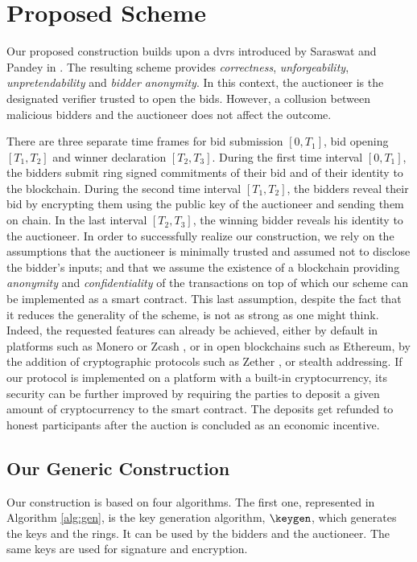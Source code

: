 \section{Proposed Scheme}
	Our proposed construction builds upon a \gls{dvrs} introduced by Saraswat and Pandey in \cite{saraswat2014leak}. The resulting scheme provides \textit{correctness}, \textit{unforgeability}, \textit{unpretendability} and \textit{bidder anonymity}. In this context, the auctioneer is the designated verifier trusted to open the bids. However, a collusion between malicious bidders and the auctioneer does not affect the outcome.

	There are three separate time frames for bid submission $[0,T_1]$, bid opening $[T_1,T_2]$ and winner declaration $[T_2,T_3]$. During the first time interval $[0,T_1]$, the bidders submit ring signed commitments of their bid and of their identity to the blockchain. During the second time interval $[T_1,T_2]$, the bidders reveal their bid by encrypting them using the public key of the auctioneer and sending them on chain. In the last interval $[T_2,T_3]$, the winning bidder reveals his identity to the auctioneer. In order to successfully realize our construction, we rely on the assumptions that the auctioneer is minimally trusted and assumed not to disclose the bidder's inputs; and that we assume the existence of a blockchain providing \textit{anonymity} and \textit{confidentiality} of the transactions on top of which our scheme can be implemented as a smart contract. This last assumption, despite the fact that it reduces the generality of the scheme, is not as strong as one might think. Indeed, the requested features can already be achieved, either by default in platforms such as Monero or Zcash \cite{sasson2014zerocash}, or in open blockchains such as Ethereum, by the addition of cryptographic protocols such as Zether \cite{bunz2019zether}, or stealth addressing. If our protocol is implemented on a platform with a built-in cryptocurrency, its security can be further improved by requiring the parties to deposit a given amount of cryptocurrency to the smart contract. The deposits get refunded to honest participants after the auction is concluded as an economic incentive.
	
\subsection{Our Generic Construction}

	Our construction is based on four algorithms. The first one, represented in Algorithm \ref{alg:gen}, is the key generation algorithm, $\keygen$, which generates the keys and the rings.  It can be used by the bidders and the auctioneer. The same keys are used for signature and encryption.

